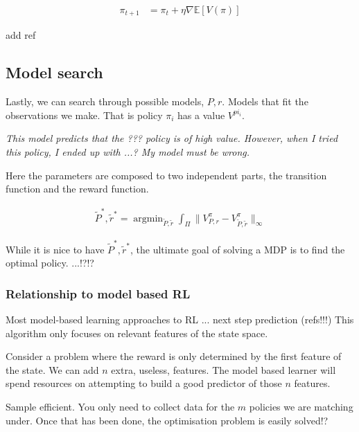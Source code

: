 \begin{align}
\pi_{t+1} &= \pi_t + \eta \nabla \mathbb E [V(\pi)]
\end{align}

add ref


\subsection{Model search}

Lastly, we can search through possible models, $P, r$. Models that fit the
observations we make. That is policy $\pi_i$ has a value $V^{pi_i}$.

\begin{displayquote}
  \textit{This model predicts that the ??? policy is of high value.
  However, when I tried this policy, I ended up with ...?
  My model must be wrong.}
\end{displayquote}

Here the parameters are composed to two independent parts, the transition function
and the reward function.

\begin{align}
\tilde P^{* }, \tilde r^{* } = \mathop{\text{argmin}}_{\tilde P, \tilde r} \int_{\Pi} \parallel V^{\pi}_{P, r} -V^{\pi}_{\tilde P, \tilde r} \parallel_\infty
\end{align}

While it is nice to have $\tilde P^{* }, \tilde r^{* }$, the ultimate goal of
solving a MDP is to find the optimal policy. ...!?!?

\subsubsection{Relationship to model based RL}

Most model-based learning approaches to RL ... next step prediction (refs!!!)
This algorithm only focuses on relevant features of the state space.

Consider a problem where the reward is only determined by the first feature of the state. We can add $n$ extra, useless, features.
The model based learner will spend resources on attempting to build a good predictor of those $n$ features.

Sample efficient. You only need to collect data for the $m$ policies we are matching under.
Once that has been done, the optimisation problem is easily solved!?

